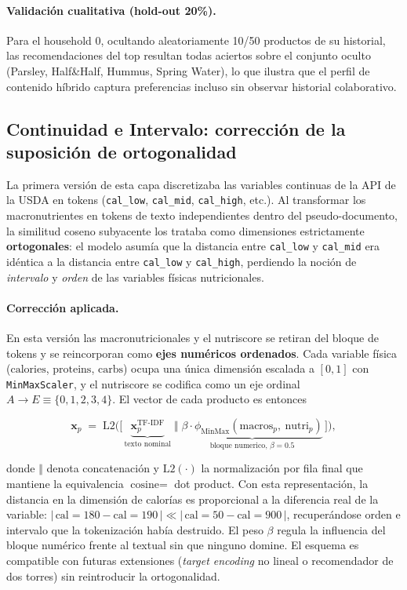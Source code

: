\documentclass[12pt,a4paper]{article}
\newcommand{\code}[1]{\texttt{\small #1}}
\begin{document}
\paragraph{Validación cualitativa (hold-out 20\%).} Para el household 0, ocultando aleatoriamente 10/50 productos de su historial, las recomendaciones del top resultan todas aciertos sobre el conjunto oculto (Parsley, Half\&Half, Hummus, Spring Water), lo que ilustra que el perfil de contenido híbrido captura preferencias incluso sin observar historial colaborativo.

\subsection{Continuidad e Intervalo: corrección de la suposición de ortogonalidad}
\label{sec:ortogonalidad}
La primera versión de esta capa discretizaba las variables continuas de la API de la USDA en tokens (\code{cal\_low}, \code{cal\_mid}, \code{cal\_high}, etc.). Al transformar los macronutrientes en tokens de texto independientes dentro del pseudo-documento, la similitud coseno subyacente los trataba como dimensiones estrictamente \textbf{ortogonales}: el modelo asumía que la distancia entre \code{cal\_low} y \code{cal\_mid} era idéntica a la distancia entre \code{cal\_low} y \code{cal\_high}, perdiendo la noción de \emph{intervalo} y \emph{orden} de las variables físicas nutricionales.

\paragraph{Corrección aplicada.} En esta versión las macronutricionales y el nutriscore se retiran del bloque de tokens y se reincorporan como \textbf{ejes numéricos ordenados}. Cada variable física ($\text{calories}$, $\text{proteins}$, $\text{carbs}$) ocupa una única dimensión escalada a $[0,1]$ con \code{MinMaxScaler}, y el nutriscore se codifica como un eje ordinal $A\!\to\!E \equiv \{0,1,2,3,4\}$. El vector de cada producto es entonces

\[
\mathbf{x}_p \;=\; \mathrm{L2}\!\Big(\big[\, \underbrace{\mathbf{x}^{\text{TF-IDF}}_p}_{\text{texto nominal}} \;\big\Vert\; \underbrace{\beta\cdot \phi_{\text{MinMax}}(\text{macros}_p,\ \text{nutri}_p)}_{\text{bloque numerico, }\beta=0.5} \,\big]\Big),
\]

donde $\Vert$ denota concatenación y $\mathrm{L2}(\cdot)$ la normalización por fila final que mantiene la equivalencia $\text{cosine} = $ dot product. Con esta representación, la distancia en la dimensión de calorías es proporcional a la diferencia real de la variable: $|\,\text{cal}{=}180 - \text{cal}{=}190\,| \ll |\,\text{cal}{=}50 - \text{cal}{=}900\,|$, recuperándose orden e intervalo que la tokenización había destruido. El peso $\beta$ regula la influencia del bloque numérico frente al textual sin que ninguno domine. El esquema es compatible con futuras extensiones (\textit{target encoding} no lineal o recomendador de dos torres) sin reintroducir la ortogonalidad.
\end{document}
